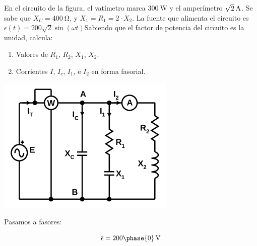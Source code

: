 \documentclass[12pt]{article}
\begin{document}




En el circuito de la figura, el vatímetro marca $\SI{300}{\watt}$ y el amperímetro $\SI[parse-numbers=false]{\sqrt{2}}{\ampere}$. Se sabe que $X_C = \SI{400}{\ohm}$, y $X_1 = R_1 = 2 \cdot X_2$. La fuente que alimenta el circuito es $\epsilon(t) = 200\sqrt{2} \sin(\omega t)$Sabiendo que el factor de potencia del circuito es la unidad, calcula:

\begin{enumerate}
\item Valores de $R_1$, $R_2$, $X_1$, $X_2$.
\item Corrientes $I$, $I_c$, $I_1$, e $I_2$ en forma fasorial. 
\end{enumerate}

\begin{center}
  \includegraphics{figs/problema11}
\end{center}


Pasamos a fasores:

\[
  \overline{\epsilon} = \SI[parse-numbers=false]{200\phase{0}}{\volt}
\]
\end{document}
